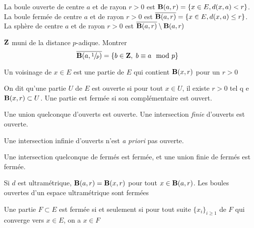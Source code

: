 \begin{dfn}
    La boule ouverte de centre $a$ et de rayon  $r>0$ est  $\mathbf B(a, r)=\{x \in  E, d(x, a)<r\}$. La boule fermée de centre $a$ et de rayon  $r>0$ est  $\overline{\mathbf B(a, r)}=\{x \in  E, d(x, a)\leq r\}$. La sphère de centre $a$ et de rayon  $r>0$ est $\overline{\mathbf B(a, r)}\setminus \mathbf B(a, r)$
\end{dfn}


\begin{exo}
$\mathbf Z$ muni de la distance $p$-adique. Montrer \[
    \overline{\mathbf B(a, \sfrac{1}{p})}= \left\{ b \in  \mathbf Z, \; b\equiv a \mod p \right\} 
\] 
\end{exo}

\begin{dfn}
    Un voisinage de $x \in  E$ est une partie de $E$ qui contient  $\mathbf B(x, r)$ pour un $r>0$
\end{dfn}

\begin{dfn}
    On dit qu'une partie $U$ de $E$ est ouverte si pour tout $x \in  U$, il existe $r>0$ tel q e $ \mathbf B(x, r) \subset U$. Une partie est fermée si son complémentaire est ouvert.
\end{dfn}

\begin{prop}
    Une union quelconque d'ouverts est ouverte. Une intersection \emph{finie} d'ouverts est ouverte.
\end{prop}

\begin{rem}
Une intersection infinie d'ouverts n'est \emph{a priori} pas ouverte.
\end{rem}

\begin{cor}
Une intersection quelconque de fermés est fermée, et une union finie de fermés est fermée.
\end{cor}

\begin{exo}
    Si $d$ est ultramétrique,  $\mathbf B(a, r)=\mathbf B(x, r)$ pour tout $x \in  \mathbf B(a, r)$. Les boules ouvertes d'un espace ultramétrique sont fermées
\end{exo}

\begin{thm}
    Une partie $F\subset E$ est fermée  si et seulement si pour tout suite $\{x_i\}_{i\geq 1}$ de $F$ qui converge vers $x \in  E$, on a $x \in  F$
\end{thm}

